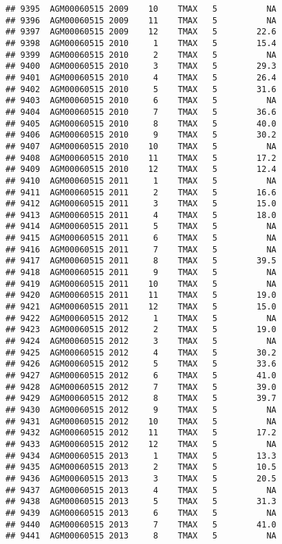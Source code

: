 \documentclass{article}\usepackage[]{graphicx}\usepackage[]{color}
\makeatletter
\newenvironment{kframe}{%
 \def\at@end@of@kframe{}%
 \ifinner\ifhmode%
  \def\at@end@of@kframe{\end{minipage}}%
  \begin{minipage}{\columnwidth}%
 \fi\fi%
 \def\FrameCommand##1{\hskip\@totalleftmargin \hskip-\fboxsep
 \colorbox{shadecolor}{##1}\hskip-\fboxsep
     \hskip-\linewidth \hskip-\@totalleftmargin \hskip\columnwidth}%
 \MakeFramed {\advance\hsize-\width
   \@totalleftmargin\z@ \linewidth\hsize
   \@setminipage}}%
 {\par\unskip\endMakeFramed%
 \at@end@of@kframe}
\newenvironment{knitrout}{}{} %
\makeatother
\begin{document}
\begin{knitrout}
\begin{kframe}
\begin{verbatim}
## 9395  AGM00060515 2009    10    TMAX   5          NA
## 9396  AGM00060515 2009    11    TMAX   5          NA
## 9397  AGM00060515 2009    12    TMAX   5        22.6
## 9398  AGM00060515 2010     1    TMAX   5        15.4
## 9399  AGM00060515 2010     2    TMAX   5          NA
## 9400  AGM00060515 2010     3    TMAX   5        29.3
## 9401  AGM00060515 2010     4    TMAX   5        26.4
## 9402  AGM00060515 2010     5    TMAX   5        31.6
## 9403  AGM00060515 2010     6    TMAX   5          NA
## 9404  AGM00060515 2010     7    TMAX   5        36.6
## 9405  AGM00060515 2010     8    TMAX   5        40.0
## 9406  AGM00060515 2010     9    TMAX   5        30.2
## 9407  AGM00060515 2010    10    TMAX   5          NA
## 9408  AGM00060515 2010    11    TMAX   5        17.2
## 9409  AGM00060515 2010    12    TMAX   5        12.4
## 9410  AGM00060515 2011     1    TMAX   5          NA
## 9411  AGM00060515 2011     2    TMAX   5        16.6
## 9412  AGM00060515 2011     3    TMAX   5        15.0
## 9413  AGM00060515 2011     4    TMAX   5        18.0
## 9414  AGM00060515 2011     5    TMAX   5          NA
## 9415  AGM00060515 2011     6    TMAX   5          NA
## 9416  AGM00060515 2011     7    TMAX   5          NA
## 9417  AGM00060515 2011     8    TMAX   5        39.5
## 9418  AGM00060515 2011     9    TMAX   5          NA
## 9419  AGM00060515 2011    10    TMAX   5          NA
## 9420  AGM00060515 2011    11    TMAX   5        19.0
## 9421  AGM00060515 2011    12    TMAX   5        15.0
## 9422  AGM00060515 2012     1    TMAX   5          NA
## 9423  AGM00060515 2012     2    TMAX   5        19.0
## 9424  AGM00060515 2012     3    TMAX   5          NA
## 9425  AGM00060515 2012     4    TMAX   5        30.2
## 9426  AGM00060515 2012     5    TMAX   5        33.6
## 9427  AGM00060515 2012     6    TMAX   5        41.0
## 9428  AGM00060515 2012     7    TMAX   5        39.0
## 9429  AGM00060515 2012     8    TMAX   5        39.7
## 9430  AGM00060515 2012     9    TMAX   5          NA
## 9431  AGM00060515 2012    10    TMAX   5          NA
## 9432  AGM00060515 2012    11    TMAX   5        17.2
## 9433  AGM00060515 2012    12    TMAX   5          NA
## 9434  AGM00060515 2013     1    TMAX   5        13.3
## 9435  AGM00060515 2013     2    TMAX   5        10.5
## 9436  AGM00060515 2013     3    TMAX   5        20.5
## 9437  AGM00060515 2013     4    TMAX   5          NA
## 9438  AGM00060515 2013     5    TMAX   5        31.3
## 9439  AGM00060515 2013     6    TMAX   5          NA
## 9440  AGM00060515 2013     7    TMAX   5        41.0
## 9441  AGM00060515 2013     8    TMAX   5          NA

\end{verbatim}
\end{kframe}
\end{knitrout}
\end{document}
